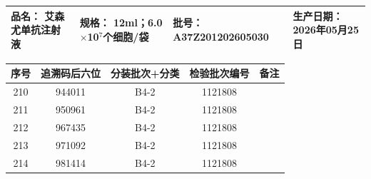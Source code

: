 \documentclass[UTF8,10pt,a4paper,fontset=fandol]{ctexart}
\newcommand{\fieldvalue}[1]{#1}
\begin{document}
\begin{center}
\small
\begin{tabular}{|p{2.2cm}|p{3.8cm}|p{1.8cm}|p{3.8cm}|}
\hline
品名：
\fieldvalue{艾森尤单抗注射液}
&
规格：
\fieldvalue{12ml；6.0$\times$10$^{7}$个细胞/袋}
&
批号：
\fieldvalue{A37Z201202605030}
&
生产日期：
\fieldvalue{2026年05月25日}
\\
\hline
\end{tabular}

\vspace{2pt}

\begin{tabular}{|c|c|c|c|c|}
\hline
序号 & 追溯码后六位 & 分装批次+分类 & 检验批次编号 & 备注 \\
\hline
210 &
\fieldvalue{944011} &
\fieldvalue{B4-2} &
\fieldvalue{1121808} & \\ \hline
211 &
\fieldvalue{950961} &
\fieldvalue{B4-2} &
\fieldvalue{1121808} & \\ \hline
212 &
\fieldvalue{967435} &
\fieldvalue{B4-2} &
\fieldvalue{1121808} & \\ \hline
213 &
\fieldvalue{971092} &
\fieldvalue{B4-2} &
\fieldvalue{1121808} & \\ \hline
214 &
\fieldvalue{981414} &
\fieldvalue{B4-2} &
\fieldvalue{1121808} & \\ \hline

\end{tabular}
\end{center}
\end{document}
